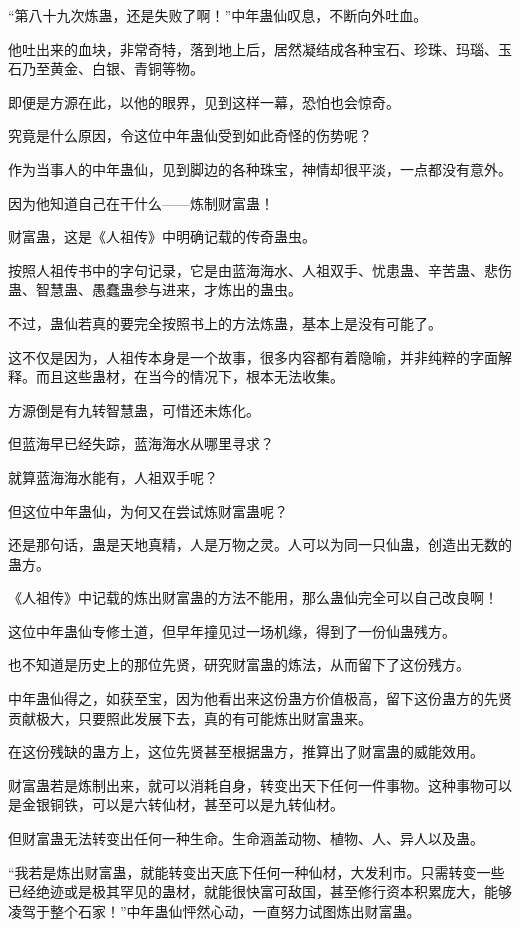 \begin{this_body}
“第八十九次炼蛊，还是失败了啊！”中年蛊仙叹息，不断向外吐血。

他吐出来的血块，非常奇特，落到地上后，居然凝结成各种宝石、珍珠、玛瑙、玉石乃至黄金、白银、青铜等物。

即便是方源在此，以他的眼界，见到这样一幕，恐怕也会惊奇。

究竟是什么原因，令这位中年蛊仙受到如此奇怪的伤势呢？

作为当事人的中年蛊仙，见到脚边的各种珠宝，神情却很平淡，一点都没有意外。

因为他知道自己在干什么——炼制财富蛊！

财富蛊，这是《人祖传》中明确记载的传奇蛊虫。

按照人祖传书中的字句记录，它是由蓝海海水、人祖双手、忧患蛊、辛苦蛊、悲伤蛊、智慧蛊、愚蠢蛊参与进来，才炼出的蛊虫。

不过，蛊仙若真的要完全按照书上的方法炼蛊，基本上是没有可能了。

这不仅是因为，人祖传本身是一个故事，很多内容都有着隐喻，并非纯粹的字面解释。而且这些蛊材，在当今的情况下，根本无法收集。

方源倒是有九转智慧蛊，可惜还未炼化。

但蓝海早已经失踪，蓝海海水从哪里寻求？

就算蓝海海水能有，人祖双手呢？

但这位中年蛊仙，为何又在尝试炼财富蛊呢？

还是那句话，蛊是天地真精，人是万物之灵。人可以为同一只仙蛊，创造出无数的蛊方。

《人祖传》中记载的炼出财富蛊的方法不能用，那么蛊仙完全可以自己改良啊！

这位中年蛊仙专修土道，但早年撞见过一场机缘，得到了一份仙蛊残方。

也不知道是历史上的那位先贤，研究财富蛊的炼法，从而留下了这份残方。

中年蛊仙得之，如获至宝，因为他看出来这份蛊方价值极高，留下这份蛊方的先贤贡献极大，只要照此发展下去，真的有可能炼出财富蛊来。

在这份残缺的蛊方上，这位先贤甚至根据蛊方，推算出了财富蛊的威能效用。

财富蛊若是炼制出来，就可以消耗自身，转变出天下任何一件事物。这种事物可以是金银铜铁，可以是六转仙材，甚至可以是九转仙材。

但财富蛊无法转变出任何一种生命。生命涵盖动物、植物、人、异人以及蛊。

“我若是炼出财富蛊，就能转变出天底下任何一种仙材，大发利市。只需转变一些已经绝迹或是极其罕见的蛊材，就能很快富可敌国，甚至修行资本积累庞大，能够凌驾于整个石家！”中年蛊仙怦然心动，一直努力试图炼出财富蛊。


\end{this_body}
